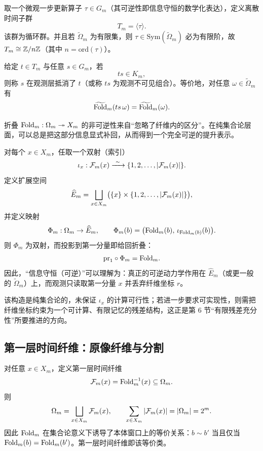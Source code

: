 \begin{definition}[离散时间子群]\label{def:time-subgroup}
取一个微观一步更新算子 $\tau\in G_m$（其可逆性即信息守恒的数学化表达），定义离散时间子群
$$
T_m=\langle \tau\rangle.
$$
该群为循环群。并且若 $\widetilde{\Omega}_m$ 为有限集，则 $\tau\in \mathrm{Sym}(\widetilde{\Omega}_m)$ 必为有限阶，故 $T_m\cong \mathbb{Z}/n\mathbb{Z}$（其中 $n=\mathrm{ord}(\tau)$）。
\end{definition}

\begin{definition}[观测层抵消]\label{def:observable-cancellation}
给定 $t\in T_m$ 与任意 $s\in G_m$，若
$$
ts\in K_m,
$$
则称 $s$ 在观测层抵消了 $t$（或称 $ts$ 为观测不可见组合）。等价地，对任意 $\omega\in\widetilde{\Omega}_m$ 有
$$
\widetilde{\mathrm{Fold}}_m(ts\,\omega)=\widetilde{\mathrm{Fold}}_m(\omega).
$$
\end{definition}

\begin{remark}\label{rem:fold-bijection-lift}
折叠 $\mathrm{Fold}_m:\Omega_m\twoheadrightarrow X_m$ 的非可逆性来自“忽略了纤维内的区分”。在纯集合论层面，可以总是把这部分信息显式补回，从而得到一个完全可逆的提升表示。\par

对每个 $x\in X_m$，任取一个双射（索引）
$$
\iota_x:\mathcal F_m(x)\xrightarrow{\ \sim\ }\{1,2,\dots,\abs{\mathcal F_m(x)}\}.
$$
定义扩展空间
$$
\widehat{E}_m=\bigsqcup_{x\in X_m}\bigl(\{x\}\times \{1,2,\dots,\left\lvert \mathcal F_m(x)\right\rvert\}\bigr),
$$
并定义映射
$$
\Phi_m:\Omega_m\to \widehat{E}_m,\qquad
\Phi_m(b)=\bigl(\mathrm{Fold}_m(b),\,\iota_{\mathrm{Fold}_m(b)}(b)\bigr).
$$
则 $\Phi_m$ 为双射，而投影到第一分量即给回折叠：
$$
\mathrm{pr}_1\circ \Phi_m=\mathrm{Fold}_m.
$$
因此，“信息守恒（可逆）”可以理解为：真正的可逆动力学作用在 $\widehat{E}_m$（或更一般的 $\widetilde{\Omega}_m$）上，而观测只读取第一分量 $x$ 并丢弃纤维坐标 $r$。\par

该构造是纯集合论的，未保证 $\iota_x$ 的计算可行性；若进一步要求可实现性，则需把纤维坐标约束为一个可计算、有限记忆的残差结构，这正是第 6 节“有限残差充分性”所要推进的方向。
\end{remark}

\subsection{第一层时间纤维：原像纤维与分割}

对任意 $x\in X_m$，定义第一层时间纤维
$$
\mathcal F_m(x)=\mathrm{Fold}_m^{-1}(x)\subseteq \Omega_m.
$$
则
$$
\Omega_m=\bigsqcup_{x\in X_m}\mathcal F_m(x),
\qquad
\sum_{x\in X_m}\left\lvert \mathcal F_m(x)\right\rvert=\left\lvert \Omega_m\right\rvert=2^m.
$$
因此 $\mathrm{Fold}_m$ 在集合论意义下诱导了本体窗口上的等价关系：$b\sim b'$ 当且仅当 $\mathrm{Fold}_m(b)=\mathrm{Fold}_m(b')$。第一层时间纤维即该等价类。

